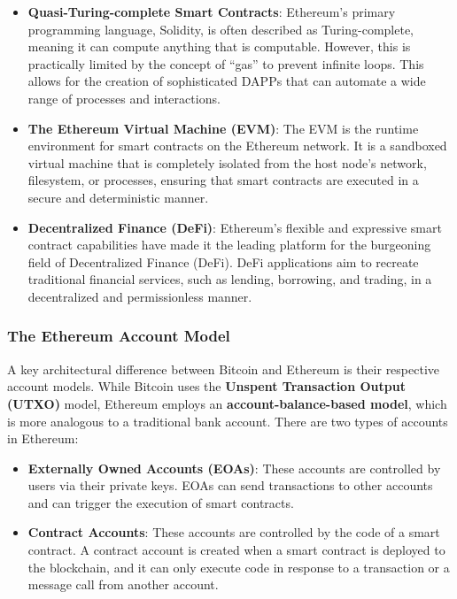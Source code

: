 \begin{itemize}
	\tightlist
	\item
	\textbf{Quasi-Turing-complete Smart Contracts}: Ethereum's primary
	programming language, Solidity, is often described as Turing-complete,
	meaning it can compute anything that is computable. However, this is
	practically limited by the concept of ``gas'' to prevent infinite
	loops. This allows for the creation of sophisticated DAPPs that can
	automate a wide range of processes and interactions.
	\item
	\textbf{The Ethereum Virtual Machine (EVM)}: The EVM is the runtime
	environment for smart contracts on the Ethereum network. It is a
	sandboxed virtual machine that is completely isolated from the host
	node's network, filesystem, or processes, ensuring that smart
	contracts are executed in a secure and deterministic manner.
	\item
	\textbf{Decentralized Finance (DeFi)}: Ethereum's flexible and
	expressive smart contract capabilities have made it the leading
	platform for the burgeoning field of Decentralized Finance (DeFi).
	DeFi applications aim to recreate traditional financial services, such
	as lending, borrowing, and trading, in a decentralized and
	permissionless manner.
\end{itemize}

\subsubsection{The Ethereum Account
	Model}\label{the-ethereum-account-model}

A key architectural difference between Bitcoin and Ethereum is their
respective account models. While Bitcoin uses the \textbf{Unspent
	Transaction Output (UTXO)} model, Ethereum employs an
\textbf{account-balance-based model}, which is more analogous to a traditional
bank account. There are two types of accounts in Ethereum:

\begin{itemize}
	\tightlist
	\item
	\textbf{Externally Owned Accounts (EOAs)}: These accounts are
	controlled by users via their private keys. EOAs can send transactions
	to other accounts and can trigger the execution of smart contracts.
	\item
	\textbf{Contract Accounts}: These accounts are controlled by the code
	of a smart contract. A contract account is created when a smart
	contract is deployed to the blockchain, and it can only execute code
	in response to a transaction or a message call from another account.
\end{itemize}

